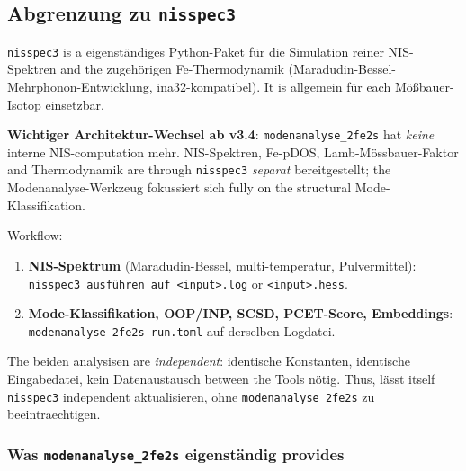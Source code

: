 \documentclass[11pt,a4paper,twoside]{article}
\theoremstyle{remark}
\begin{document}
\subsection{Abgrenzung zu \texttt{nisspec3}}
\label{sec:nisspec-link}

\texttt{nisspec3} is a eigenst\"andiges Python-Paket f\"ur die
Simulation reiner NIS-Spektren and the zugeh\"origen Fe-Thermodynamik
(Maradudin-Bessel-Mehrphonon-Entwicklung, ina32-kompatibel). It is
allgemein f\"ur each M\"o\ss bauer-Isotop einsetzbar.

\textbf{Wichtiger Architektur-Wechsel ab v3.4}: \texttt{modenanalyse\_2fe2s}
hat \emph{keine} interne NIS-computation mehr. NIS-Spektren, Fe-pDOS,
Lamb-Mössbauer-Faktor and Thermodynamik are through \texttt{nisspec3}
\emph{separat} bereitgestellt; the Modenanalyse-Werkzeug fokussiert
sich fully on the structural Mode-Klassifikation.

Workflow:

\begin{enumerate}
  \item \textbf{NIS-Spektrum} (Maradudin-Bessel, multi-temperatur,
        Pulvermittel): \texttt{nisspec3 ausf\"uhren auf
        \texttt{<input>.log}} or \texttt{<input>.hess}.
  \item \textbf{Mode-Klassifikation, OOP/INP, SCSD, PCET-Score, Embeddings}:
        \texttt{modenanalyse-2fe2s run.toml} auf derselben Logdatei.
\end{enumerate}

The beiden analysisen are \emph{independent}: identische Konstanten,
identische Eingabedatei, kein Datenaustausch between the Tools n\"otig.
Thus, l\"asst itself \texttt{nisspec3} independent aktualisieren, ohne
\texttt{modenanalyse\_2fe2s} zu beeintraechtigen.

\subsubsection*{Was \texttt{modenanalyse\_2fe2s} eigenst\"andig provides}
\end{document}
